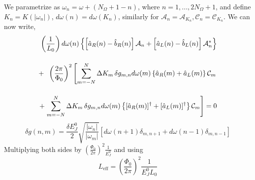 We parametrize as $\omega_n = \omega + (N_{\Omega} + 1 - n)$, where $n = 1, ..., 2N_{\Omega}+1$, and define $K_n = K(|\omega_n|)$, $d \omega (n) = d \omega(K_n)$, similarly for $\mathcal{A}_n = \mathcal{A}_{K_n}, \mathcal{C}_n = \mathcal{C}_{K_n}$. We can now write, 
%
\begin{equation}\label{eq:BC_discrete_1}
\begin{split}
    \left(\frac{1}{L_0}\right)
    d\omega(n)
    \left\lbrace
    \left[\hat{a}_R(n) - \hat{b}_R(n)\right]
    \mathcal{A}_n 
    +
    \left[\hat{a}_L(n) - \hat{b}_L(n)\right]
    \mathcal{A}^*_n
    \right\rbrace
    \\[4mm]
    +\hspace{2mm}
    \left(\frac{2\pi}{\Phi_0}\right)^2
    \left[
    \sum_{m=-N}^{N} \Delta K_m\,
    \delta g_{m, n}
    d \omega(m)
    \left\lbrace \hat{a}_R(m) + \hat{a}_L(m) \right\rbrace
    \mathcal{C}_m\right.
    \\[4mm]
    +
    \left.
    \sum_{m=-N}^{N} \Delta K_m\,
    \delta g_{m, n}
    d \omega(m)
    \left\lbrace [\hat{a}_R(m)]^\dagger + [\hat{a}_L(m)]^\dagger \right\rbrace
    \mathcal{C}_m
    \right]
    = 0
 \end{split}
\end{equation}
%
\begin{equation}
    \delta g(n,m)= 
    \frac{\delta E_J^0}{2}
    \sqrt{\frac{|\omega_n|}{|\omega_m|}}
    \left[ 
    d\omega (n+1) \delta_{m, n+1}
    + d\omega (n-1) \delta_{m, n-1}
    \right]
\end{equation}
%
Multiplying both sides by $\left(\frac{\Phi_0}{2\pi}\right)^2 \frac{1}{E_J^0}$ and using 
\begin{equation}
    L_{\text{eff}} = \left(\frac{\Phi_0}{2\pi}\right)^2 \frac{1}{E_J^0 L_0}
\end{equation}
%


